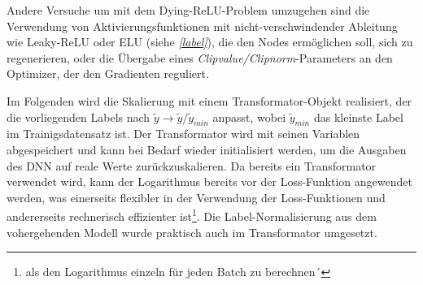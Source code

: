 Andere Versuche um mit dem Dying-ReLU-Problem umzugehen sind die Verwendung von Aktivierungsfunktionen mit nicht-verschwindender Ableitung wie Leaky-ReLU oder ELU (siehe \textit{\autoref{label}}), die den Nodes ermöglichen soll, sich zu regenerieren, oder die Übergabe eines \textit{Clipvalue/Clipnorm}-Parameters an den Optimizer, der den Gradienten reguliert.
 
Im Folgenden wird die Skalierung mit einem Transformator-Objekt realisiert, der die vorliegenden Labels nach $\tilde{y} \rightarrow \tilde{y}/{\tilde{y}_{min}}$
anpasst, wobei $\tilde{y}_{min}$ das kleinste Label im Trainigsdatensatz ist. Der Transformator wird mit seinen Variablen abgespeichert und kann bei Bedarf wieder initialisiert werden, um die Ausgaben des DNN auf reale Werte zurückzuskalieren. 
Da bereits ein Transformator verwendet wird, kann der Logarithmus bereits vor der Loss-Funktion angewendet werden, was einerseits flexibler in der Verwendung der Loss-Funktionen und andererseits rechnerisch effizienter ist\footnote{als den Logarithmus einzeln für jeden Batch zu berechnen´}. Die Label-Normalisierung aus dem vohergehenden Modell wurde praktisch auch im Transformator umgesetzt.

